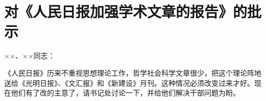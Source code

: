 \section[对《人民日报加强学术文章的报告》的批示（一九六四年二月三日）]{对《人民日报加强学术文章的报告》的批示}


××、××同志：

《人民日报》历来不重视思想理论工作，哲学社会科学文章很少，把这个理论阵地送给《光明日报》、《文汇报》和《新建设》月刊。这种情况必须改变过来才好。现在他们有了改的主意了，请书记处讨论一下，并给他们解决干部问题为盼。


